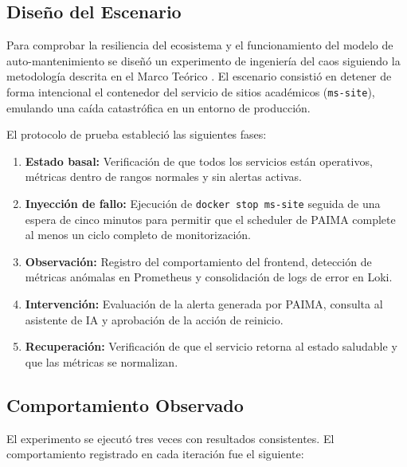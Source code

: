 \subsection{Diseño del Escenario}

Para comprobar la resiliencia del ecosistema y el funcionamiento del modelo de
auto-mantenimiento se diseñó un experimento de ingeniería del caos siguiendo la
metodología descrita en el Marco Teórico \cite{basiri2016chaos}. El escenario consistió en detener de
forma intencional el contenedor del servicio de sitios académicos
(\texttt{ms-site}), emulando una caída catastrófica en un entorno de producción.

El protocolo de prueba estableció las siguientes fases:

\begin{enumerate}
    \item \textbf{Estado basal:} Verificación de que todos los servicios están
    operativos, métricas dentro de rangos normales y sin alertas activas.
    \item \textbf{Inyección de fallo:} Ejecución de \texttt{docker stop ms-site}
    seguida de una espera de cinco minutos para permitir que el scheduler de
    PAIMA complete al menos un ciclo completo de monitorización.
    \item \textbf{Observación:} Registro del comportamiento del frontend,
    detección de métricas anómalas en Prometheus y consolidación de logs de error
    en Loki.
    \item \textbf{Intervención:} Evaluación de la alerta generada por PAIMA,
    consulta al asistente de IA y aprobación de la acción de reinicio.
    \item \textbf{Recuperación:} Verificación de que el servicio retorna al estado
    saludable y que las métricas se normalizan.
\end{enumerate}

\subsection{Comportamiento Observado}

El experimento se ejecutó tres veces con resultados consistentes. El comportamiento
registrado en cada iteración fue el siguiente:

